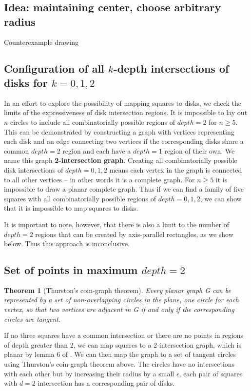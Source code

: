 \documentclass{NSF}
\newtheorem{theorem}{Theorem}[section]
\begin{document}
\subsection{Idea: maintaining center, choose arbitrary radius}
Counterexample drawing

\subsection{Configuration of all \texorpdfstring{$k$}{k}-depth intersections of disks for \texorpdfstring{$k=0,1,2$}{k=0,1,2}}
In an effort to explore the possibility of mapping squares to disks, we check the limits of the expressiveness of disk intersection regions. It is impossible to lay out $n$ circles to include all combinatorially possible regions of $depth=2$ for $n \geq 5$. This can be demonstrated by constructing a graph with vertices representing each disk and an edge connecting two vertices if the corresponding disks share a common $depth=2$ region and each have a $depth= 1$ region of their own. We name this graph \textbf{2-intersection graph}. Creating all combinatorially possible disk intersections of $depth=0,1,2$ means each vertex in the graph is connected to all other vertices -- in other words it is a complete graph. For $n \geq 5$ it is impossible to draw a planar complete graph. Thus if we can find a family of five squares with all combinatorially possible regions of $depth=0,1,2$, we can show that it is impossible to map squares to disks.

It is important to note, however, that there is also a limit to the number of $depth=2$ regions that can be created by axis-parallel rectangles, as we show below. Thus this approach is inconclusive.

\subsection{Set of points in maximum \texorpdfstring{$depth=2$}{depth=2} }
\label{section:thurston}
\begin{theorem}[Thurston’s coin-graph theorem]
Every planar graph G can be represented by a set of non-overlapping circles in the plane, one circle for each vertex, so that two vertices are adjacent in G if and only if the corresponding circles are tangent. \cite{Brightwell:doi:10.1137/0406017}
\end{theorem}
 
If no three squares have a common intersection or there are no points in regions of depth greater than 2, we can map squares to a 2-intersection graph, which is planar by lemma 6 of \cite{Pyrga:2008:NEP:1377676.1377708}. We can then map the graph to a set of tangent circles using Thurston's coin-graph theorem above. The circles have no intersections with each other but by increasing their radius by a small $\epsilon$, each pair of squares with $d=2$ intersection has a corresponding pair of disks.
\end{document}
